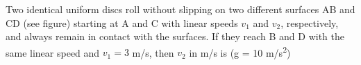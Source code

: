

\item Two identical uniform discs roll without slipping on two different surfaces AB and CD (see figure) starting at A and C with linear speeds $v_1$ and $v_2$, respectively, and always remain in contact with the surfaces. If they reach B and D with the same linear speed and $v_1 = 3$ m/s, then $v_2$ in m/s is (g = 10 m/s\textsuperscript{2})

\begin{center}
\end{center}

